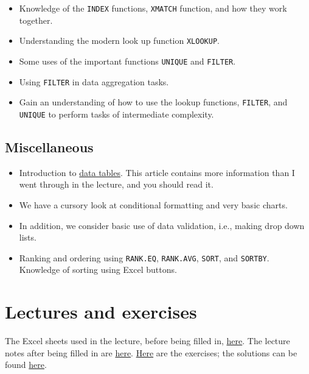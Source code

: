 \documentclass[
  letterpaper,
  DIV=11,
  numbers=noendperiod]{scrreprt}
\providecommand{\tightlist}{%
  \setlength{\itemsep}{0pt}\setlength{\parskip}{0pt}}\usepackage{longtable,booktabs,array}
\begin{document}
\begin{itemize}
\tightlist
\item
  Knowledge of the \texttt{INDEX} functions, \texttt{XMATCH} function,
  and how they work together.
\item
  Understanding the modern look up function \texttt{XLOOKUP}.
\item
  Some uses of the important functions \texttt{UNIQUE} and
  \texttt{FILTER}.
\item
  Using \texttt{FILTER} in data aggregation tasks.
\item
  Gain an understanding of how to use the lookup functions,
  \texttt{FILTER}, and \texttt{UNIQUE} to perform tasks of intermediate
  complexity.
\end{itemize}

\hypertarget{miscellaneous}{%
\subsection{Miscellaneous}\label{miscellaneous}}

\begin{itemize}
\tightlist
\item
  Introduction to \href{https://exceljet.net/articles/excel-tables}{data
  tables}. This article contains more information than I went through in
  the lecture, and you should read it.
\item
  We have a cursory look at conditional formatting and very basic
  charts.
\item
  In addition, we consider basic use of data validation, i.e., making
  drop down lists.
\item
  Ranking and ordering using \texttt{RANK.EQ}, \texttt{RANK.AVG},
  \texttt{SORT}, and \texttt{SORTBY}. Knowledge of sorting using Excel
  buttons.
\end{itemize}

\hypertarget{lectures-and-exercises-2}{%
\section{Lectures and exercises}\label{lectures-and-exercises-2}}

The Excel sheets used in the lecture, before being filled in,
\href{https://github.com/BI-DS/ELE-3915/blob/main/slides/lecture03.xlsx}{here}.
The lecture notes after being filled in are
\href{https://github.com/BI-DS/ELE-3915/blob/main/slides/lecture03_solutions.xlsx}{here}.
\href{https://github.com/BI-DS/ELE-3915/blob/main/exercises/exercises03.xlsx}{Here}
are the exercises; the solutions can be found
\href{https://github.com/BI-DS/ELE-3915/blob/main/exercises/exercises03_solutions.xlsx}{here}.
\end{document}
